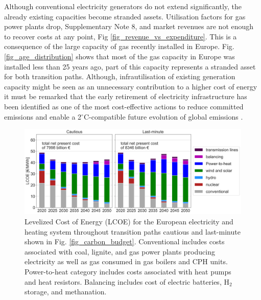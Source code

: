 \documentclass[5p]{elsarticle} %
\begin{document}
Although conventional electricity generators do not extend significantly, the already existing capacities become stranded assets. Utilisation factors for gas power plants drop, Supplementary Note 8, and market revenues are not enough to recover costs at any point, Fig \ref{fig_revenue_vs_expenditure}. This is a consequence of the large capacity of gas recently installed in Europe. Fig. \ref{fig_age_distribution} shows that most of the gas capacity in Europe was installed less than 25 years ago, part of this capacity represents a stranded asset for both transition paths. Although, infrautilisation of existing generation capacity might be seen as an unnecessary contribution to a higher cost of energy it must be remarked that the early retirement of electricity infrastructure has been identified as one of the most cost-effective actions to reduce committed emissions and enable a 2$^{\circ}$C-compatible future evolution of global emissions \cite{Tong_2019}.


\begin{figure}[!h]
\centering
\includegraphics[width=14cm]{figures/LCOE_w_TYNDP.png}
\caption{Levelized Cost of Energy (LCOE) for the European electricity and heating system throughout transition paths cautious and last-minute shown in Fig. \ref{fig_carbon_budget}. Conventional includes costs associated with coal, lignite, and gas power plants producing electricity as well as gas consumed in gas boilers and CPH units. Power-to-heat category includes costs associated with heat pumps and heat resistors. Balancing includes cost of electric batteries, H$_2$ storage, and methanation. } \label{fig_system_cost} 
\end{figure}
\end{document}
